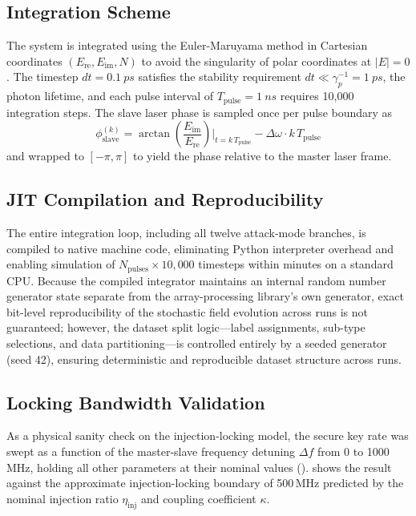 \documentclass[12pt, a4paper]{report}
\begin{document}
\subsection{Integration Scheme}
The system is integrated using the Euler-Maruyama method in Cartesian coordinates $(E_{\text{re}}, E_{\text{im}}, N)$ to avoid the singularity of polar coordinates at $|E| = 0$. The timestep $dt = \SI{0.1}{ps}$ satisfies the stability requirement $dt \ll \gamma_p^{-1} = \SI{1}{ps}$, the photon lifetime, and each pulse interval of $T_{\text{pulse}} = \SI{1}{ns}$ requires 10{,}000 integration steps. The slave laser phase is sampled once per pulse boundary as
\begin{equation}
    \phi_{\text{slave}}^{(k)} = \arctan\!\left(\frac{E_{\text{im}}}{E_{\text{re}}}\right)\bigg|_{t = k\,T_{\text{pulse}}}
    - \Delta\omega \cdot k\,T_{\text{pulse}}
\end{equation}
and wrapped to $[-\pi, \pi]$ to yield the phase relative to the master laser frame.

\subsection{JIT Compilation and Reproducibility}
The entire integration loop, including all twelve attack-mode branches, is compiled to native machine code, eliminating Python interpreter overhead and enabling simulation of $N_{\text{pulses}} \times 10{,}000$ timesteps within minutes on a standard CPU. Because the compiled integrator maintains an internal random number generator state separate from the array-processing library's own generator, exact bit-level reproducibility of the stochastic field evolution across runs is not guaranteed; however, the dataset split logic—label assignments, sub-type selections, and data partitioning—is controlled entirely by a seeded generator (seed 42), ensuring deterministic and reproducible dataset structure across runs.

\subsection{Locking Bandwidth Validation}
As a physical sanity check on the injection-locking model, the secure key rate was swept as a function of the master-slave frequency detuning $\Delta f$ from 0 to 1000\,MHz, holding all other parameters at their nominal values ().  shows the result against the approximate injection-locking boundary of 500\,MHz predicted by the nominal injection ratio $\eta_{\text{inj}}$ and coupling coefficient $\kappa$.
\end{document}
